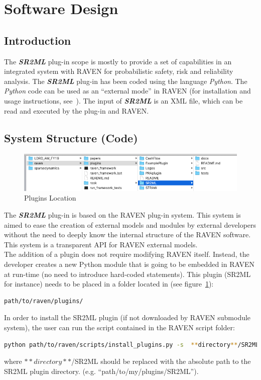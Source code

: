 \section{Software Design}
\subsection{Introduction}
The \textit{\textbf{SR2ML}} plug-in scope is mostly to provide a set of capabilities in an integrated system with RAVEN
for probabilistic safety, risk and reliability analysis.
The \textit{\textbf{SR2ML}} plug-in has been coded using the language \emph{Python}. The \emph{Python}
 code can be used as an ``external mode'' in RAVEN (for installation and usage instructions, see~\cite{RAVENuserManual}).
The input of  \textit{\textbf{SR2ML}} is an XML file, which can be read and executed by the plug-in and RAVEN.


\subsection{System Structure (Code)}
\begin{figure}
\centering
\includegraphics[width=1.0\textwidth]{pics/plugins_location.png}
\caption{Plugins Location}
\label{fig:pluginsLocation}
\end{figure}

The  \textit{\textbf{SR2ML}} plug-in is based on the RAVEN plug-in system. This system is aimed to ease the creation
of external models and modules by external developers without the need to deeply know the internal structure
of the RAVEN software. This system is a transparent API for RAVEN external models.
\\The addition of a plugin does not require modifying RAVEN itself.
Instead, the developer creates a new Python module that is going to be embedded
 in RAVEN at run-time (no need to introduce  hard-coded statements).
 This plugin (SR2ML for instance) needs to be placed in a folder  located in (see figure~\ref{fig:pluginsLocation}):
\begin{lstlisting}[language=bash]
 path/to/raven/plugins/
\end{lstlisting}
In order to install the SR2ML plugin (if not downloaded by RAVEN submodule system),
 the user can run the script contained in the RAVEN script folder:
\begin{lstlisting}[language=bash]
 python path/to/raven/scripts/install_plugins.py -s  **directory**/SR2ML
\end{lstlisting}
where  $**directory**$/SR2ML should be replaced with the absolute path to the SR2ML plugin directory.
(e.g. ``path/to/my/plugins/SR2ML'').

